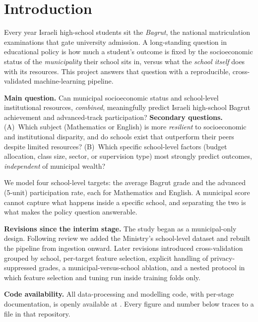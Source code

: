 \section{Introduction}

Every year Israeli high-school students sit the \emph{Bagrut}, the national
matriculation examinations that gate university admission. A long-standing
question in educational policy is how much a student's outcome is fixed by the
socioeconomic status of the \emph{municipality} their school sits in, versus what
the \emph{school itself} does with its resources. This project answers that
question with a reproducible, cross-validated machine-learning pipeline.

\textbf{Main question.} Can municipal socioeconomic status and school-level
institutional resources, \emph{combined}, meaningfully predict Israeli
high-school Bagrut achievement and advanced-track participation? \textbf{Secondary
questions.} (A)~Which subject (Mathematics or English) is more \emph{resilient}
to socioeconomic and institutional disparity, and do schools exist that
outperform their peers despite limited resources? (B)~Which specific school-level
factors (budget allocation, class size, sector, or supervision type) most
strongly predict outcomes, \emph{independent} of municipal wealth?

We model four school-level targets: the average Bagrut grade and the advanced
(5-unit) participation rate, each for Mathematics and English. A municipal score
cannot capture what happens inside a specific school, and separating the two is
what makes the policy question answerable.

\textbf{Revisions since the interim stage.} The study began as a municipal-only
design. Following review we added the Ministry's school-level dataset and rebuilt
the pipeline from ingestion onward. Later revisions introduced cross-validation
grouped by school, per-target feature selection, explicit handling of
privacy-suppressed grades, a municipal-versus-school ablation, and a nested
protocol in which feature selection and tuning run inside training folds only.

\textbf{Code availability.} All data-processing and modelling code, with
per-stage documentation, is openly available at \href{\repourl}{\repourl}. Every
figure and number below traces to a file in that repository.
